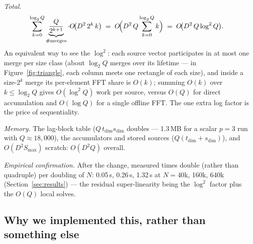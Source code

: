 \documentclass[11pt]{article}
\begin{document}
\emph{Total.}
\[
\sum_{k=0}^{\log_2 Q} \underbrace{\frac{Q}{2^{k+1}}}_{\#\text{merges}}
\cdot O\!\bigl(D^2\, 2^k\, k\bigr)
\;=\; O\!\Bigl(D^2\, Q \sum_{k=0}^{\log_2 Q} k\Bigr)
\;=\; O\!\bigl(D^2\, Q\log^2 Q\bigr).
\]
An equivalent way to see the $\log^2$: each source vector participates
in at most one merge per size class (about $\log_2 Q$ merges over its
lifetime --- in Figure~\ref{fig:triangle}, each column meets one
rectangle of each size), and inside a size-$2^k$ merge its per-element
FFT share is $O(k)$; summing $O(k)$ over $k\le\log_2 Q$ gives
$O(\log^2 Q)$ work per source, versus $O(Q)$ for direct accumulation
and $O(\log Q)$ for a single offline FFT. The one extra log factor is
the price of sequentiality.

\emph{Memory.} The lag-block table ($Q\,t_{\dim}s_{\dim}$ doubles ---
1.3\,MB for a scalar $p=3$ run with $Q\approx18{,}000$), the
accumulators and stored sources ($Q(t_{\dim}{+}s_{\dim})$), and
$O(D^2 S_{\max})$ scratch: $O(D^2 Q)$ overall.

\emph{Empirical confirmation.} After the change, measured times double
(rather than quadruple) per doubling of $N$: 0.05\,s, 0.26\,s, 1.32\,s
at $N = 40$k, 160k, 640k (Section~\ref{sec:results}) --- the residual
super-linearity being the $\log^2$ factor plus the $O(Q)$ local solves.

\subsection{Why we implemented this, rather than something else}
\label{sec:why}
\end{document}
